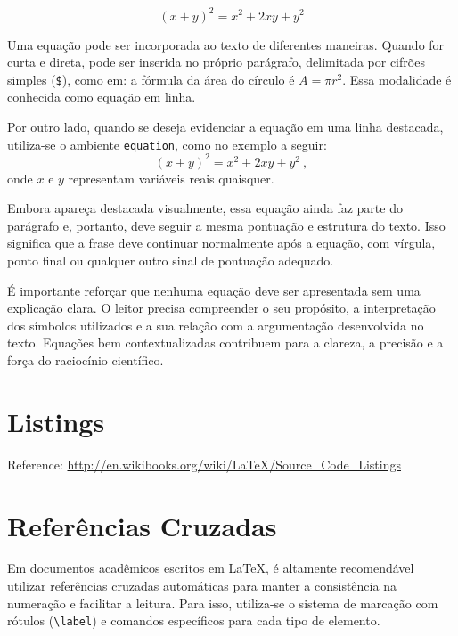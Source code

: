 \begin{equation}
  (x + y)^2 = x^2 + 2xy + y^2
  \label{eq:LABEL_EQ_1}
\end{equation}

Uma equação pode ser incorporada ao texto de diferentes maneiras. Quando for curta e direta, pode ser inserida no próprio parágrafo, delimitada por cifrões simples (\verb|$|), como em: a fórmula da área do círculo é $A = \pi r^2$. Essa modalidade é conhecida como equação em linha.

Por outro lado, quando se deseja evidenciar a equação em uma linha destacada, utiliza-se o ambiente \verb|equation|, como no exemplo a seguir:
\begin{equation}
  (x + y)^2 = x^2 + 2xy + y^2 \: ,
  \label{eq:LABEL_EQ_2}
\end{equation}
onde $x$ e $y$ representam variáveis reais quaisquer.

Embora apareça destacada visualmente, essa equação ainda faz parte do parágrafo e, portanto, deve seguir a mesma pontuação e estrutura do texto. Isso significa que a frase deve continuar normalmente após a equação, com vírgula, ponto final ou qualquer outro sinal de pontuação adequado.

É importante reforçar que nenhuma equação deve ser apresentada sem uma explicação clara. O leitor precisa compreender o seu propósito, a interpretação dos símbolos utilizados e a sua relação com a argumentação desenvolvida no texto. Equações bem contextualizadas contribuem para a clareza, a precisão e a força do raciocínio científico.



\section{Listings}\label{sec:LABEL_CHP_2_SEC_D}
Reference: \url{http://en.wikibooks.org/wiki/LaTeX/Source_Code_Listings}



\section{Referências Cruzadas}\label{sec:LABEL_CHP_2_SEC_E}

Em documentos acadêmicos escritos em \LaTeX, é altamente recomendável utilizar referências cruzadas automáticas para manter a consistência na numeração e facilitar a leitura. Para isso, utiliza-se o sistema de marcação com rótulos (\verb|\label|) e comandos específicos para cada tipo de elemento.

